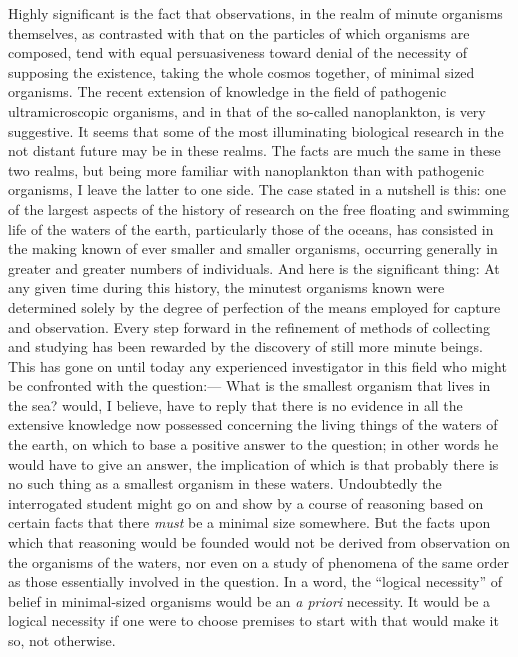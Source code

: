 \documentclass[a4paper, 11pt, oneside, polutonikogreek, english, landscape]{article}
\begin{document}
Highly significant is the fact that observations, in the realm of minute organisms themselves, as contrasted with that on the particles of which organisms are composed, tend with equal persuasiveness toward denial of the necessity of supposing the existence, taking the whole cosmos together, of minimal sized organisms. The recent extension of knowledge in the field of pathogenic ultramicroscopic organisms, and in that of the so-called nanoplankton, is very suggestive. It seems that some of the most illuminating biological research in the not distant future may be in these realms. The facts are much the same in these two realms, but being more familiar with nanoplankton than with pathogenic organisms, I leave the latter to one side. The case stated in a nutshell is this: one of the largest aspects of the history of research on the free floating and swimming life of the waters of the earth, particularly those of the oceans, has consisted in the making known of ever smaller and smaller organisms, occurring generally in greater and greater numbers of individuals. And here is the significant thing: At any given time during this history, the minutest organisms known were determined solely by the degree of perfection of the means employed for capture and observation. Every step forward in the refinement of methods of collecting and studying has been rewarded by the discovery of still more minute beings. This has gone on until today any experienced investigator in this field who might be confronted with the question:--- What is the smallest organism that lives in the sea? would, I believe, have to reply that there is no evidence in all the extensive knowledge now possessed concerning the living things of the waters of the earth, on which to base a positive answer to the question; in other words he would have to give an answer, the implication of which is that probably there is no such thing as a smallest organism in these waters. Undoubtedly the interrogated student might go on and show by a course of reasoning based on certain facts that there \emph{must} be a minimal size somewhere. But the facts upon which that reasoning would be founded would not be derived from observation on the organisms of the waters, nor even on a study of phenomena of the same order as those essentially involved in the question. In a word, the ``logical necessity'' of belief in minimal-sized organisms would be an \emph{a priori} necessity. It would be a logical necessity if one were to choose premises to start with that would make it so, not otherwise.
\end{document}
